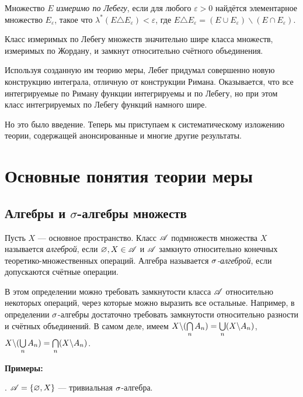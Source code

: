 \documentclass[10pt]{article}
\newcommand{\ve}{\varepsilon}
\begin{document}
\begin{df}
Множество $E$ \emph{измеримо по Лебегу}, если для любого $\ve>0$
найдётся элементарное множество $E_\ve$, такое что
$\lambda^*(E\triangle E_\ve)<\ve$, где $E\triangle E_\ve=(E\cup
E_\ve)\backslash (E\cap E_\ve)$.
\end{df}

Класс измеримых по Лебегу множеств значительно шире класса множеств,
измеримых по Жордану, и замкнут относительно счётного объединения.

Используя созданную им теорию меры, Лебег придумал совершенно новую
конструкцию интеграла, отличную от конструкции Римана. Оказывается,
что все интегрируемые по Риману функции интегрируемы и по Лебегу, но
при этом класс интегрируемых по Лебегу функций намного шире.

Но это было введение. Теперь мы приступаем к систематическому
изложению теории, содержащей анонсированные и многие другие
результаты.



\section{Основные понятия теории меры}
\subsection{Алгебры и $\sigma$-алгебры множеств}

\begin{df}
Пусть $X$ --- основное пространство. Класс $\mathscr{A}$ подмножеств
множества $X$ называется \emph{алгеброй}, если $\varnothing,X\in
\mathscr{A}$ и $\mathscr{A}$ замкнуто относительно конечных теоретико-множественных
операций. Алгебра называется \emph{$\sigma$-алгеброй}, если допускаются
счётные операции.
\end{df}

\begin{note}
В этом определении можно требовать замкнутости класса $\mathscr{A}$
относительно некоторых операций, через которые можно выразить все
остальные. Например, в определении $\sigma$-алгебры достаточно
требовать замкнутости относительно разности и счётных объединений. В
самом деле, имеем $X\backslash(\capn A_n)\bw =\cupn(X\backslash
A_n)$, $X\backslash(\cupn A_n)\bw =\capn(X\backslash A_n)$.

\end{note}

\textbf{Примеры:}

. $\mathscr{A}=\{\varnothing,X\}$ --- тривиальная $\sigma$-алгебра.
\end{document}
